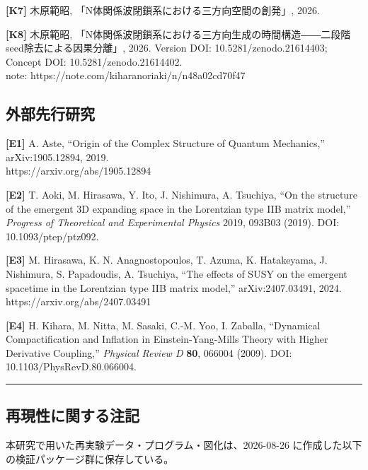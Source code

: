 \documentclass[
  a4paper,
]{ltjsarticle}
\begin{document}
\textbf{{[}K7{]}} 木原範昭, 「N体関係波閉鎖系における三方向空間の創発」,
2026.

\textbf{{[}K8{]}} 木原範昭,
「N体関係波閉鎖系における三方向生成の時間構造――二段階seed除去による因果分離」,
2026. Version DOI: 10.5281/zenodo.21614403; Concept DOI:
10.5281/zenodo.21614402.\\
note: https://note.com/kiharanoriaki/n/n48a02cd70f47

\subsection{外部先行研究}\label{ux5916ux90e8ux5148ux884cux7814ux7a76}

\textbf{{[}E1{]}} A. Aste, ``Origin of the Complex Structure of Quantum
Mechanics,'' arXiv:1905.12894, 2019.\\
https://arxiv.org/abs/1905.12894

\textbf{{[}E2{]}} T. Aoki, M. Hirasawa, Y. Ito, J. Nishimura, A.
Tsuchiya, ``On the structure of the emergent 3D expanding space in the
Lorentzian type IIB matrix model,'' \emph{Progress of Theoretical and
Experimental Physics} 2019, 093B03 (2019). DOI: 10.1093/ptep/ptz092.

\textbf{{[}E3{]}} M. Hirasawa, K. N. Anagnostopoulos, T. Azuma, K.
Hatakeyama, J. Nishimura, S. Papadoudis, A. Tsuchiya, ``The effects of
SUSY on the emergent spacetime in the Lorentzian type IIB matrix
model,'' arXiv:2407.03491, 2024.\\
https://arxiv.org/abs/2407.03491

\textbf{{[}E4{]}} H. Kihara, M. Nitta, M. Sasaki, C.-M. Yoo, I. Zaballa,
``Dynamical Compactification and Inflation in Einstein-Yang-Mills Theory
with Higher Derivative Coupling,'' \emph{Physical Review D} \textbf{80},
066004 (2009). DOI: 10.1103/PhysRevD.80.066004.

\begin{center}\rule{0.5\linewidth}{0.5pt}\end{center}

\subsection{再現性に関する注記}\label{ux518dux73feux6027ux306bux95a2ux3059ux308bux6ce8ux8a18}

本研究で用いた再実験データ・プログラム・図化は、2026-08-26
に作成した以下の検証パッケージ群に保存している。
\end{document}
